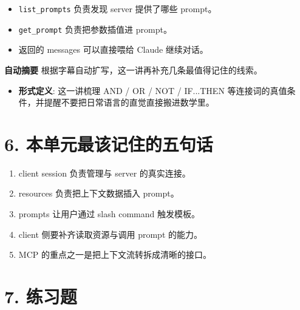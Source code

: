 \documentclass[UTF8,a4paper,11pt]{ctexart}
\begin{document}
\begin{itemize}
  \item \texttt{list\_prompts} 负责发现 server 提供了哪些 prompt。
  \item \texttt{get\_prompt} 负责把参数插值进 prompt。
  \item 返回的 messages 可以直接喂给 Claude 继续对话。
\end{itemize}

\begin{keyconcept}
\textbf{自动摘要}
根据字幕自动扩写，这一讲再补充几条最值得记住的线索。
\begin{itemize}
  \item \textbf{形式定义}: 这一讲梳理 AND / OR / NOT / IF...THEN 等连接词的真值条件，并提醒不要把日常语言的直觉直接搬进数学里。
\end{itemize}
\end{keyconcept}

\section*{6. 本单元最该记住的五句话}
\begin{enumerate}
  \item client session 负责管理与 server 的真实连接。
  \item resources 负责把上下文数据插入 prompt。
  \item prompts 让用户通过 slash command 触发模板。
  \item client 侧要补齐读取资源与调用 prompt 的能力。
  \item MCP 的重点之一是把上下文流转拆成清晰的接口。
\end{enumerate}

\section*{7. 练习题}
\end{document}
